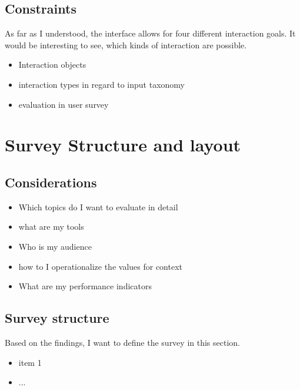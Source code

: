 \documentclass[titlepage, a4paper, 11pt]{scrartcl}
\begin{document}
        \subsection{Constraints}

            As far as I understood, the interface allows for four different interaction goals. It would be interesting to see, which kinds of interaction are possible.                

            \begin{itemize}
                \item Interaction objects
                \item interaction types in regard to input taxonomy
                \item evaluation in user survey
            \end{itemize}
        
    \section{Survey Structure and layout}

        \subsection{Considerations}

            \begin{itemize}
                \item Which topics do I want to evaluate in detail
                \item what are my tools
                \item Who is my audience
                \item how to I operationalize the values for context
                \item What are my performance indicators
            \end{itemize}

        \subsection{Survey structure}
		
            Based on the findings, I want to define the survey in this section.

            \begin{itemize}
                \item item 1
                \item ...
            \end{itemize}
\end{document}
